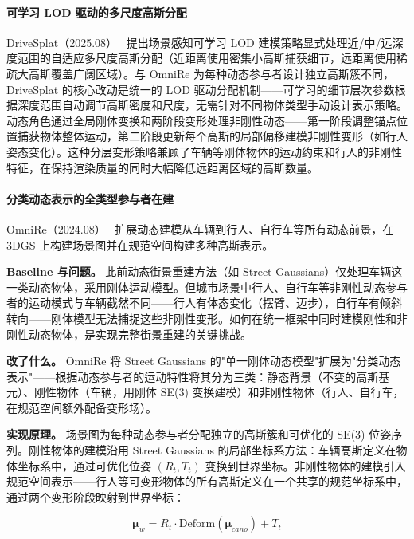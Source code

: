 \paragraph{可学习 LOD 驱动的多尺度高斯分配}

DriveSplat（2025.08）~\cite{2508_15376} 提出场景感知可学习 LOD 建模策略显式处理近/中/远深度范围的自适应多尺度高斯分配（近距离使用密集小高斯捕获细节，远距离使用稀疏大高斯覆盖广阔区域）。与 OmniRe 为每种动态参与者设计独立高斯簇不同，DriveSplat 的核心改动是统一的 LOD 驱动分配机制——可学习的细节层次参数根据深度范围自动调节高斯密度和尺度，无需针对不同物体类型手动设计表示策略。动态角色通过全局刚体变换和两阶段变形处理非刚性动态——第一阶段调整锚点位置捕获物体整体运动，第二阶段更新每个高斯的局部偏移建模非刚性变形（如行人姿态变化）。这种分层变形策略兼顾了车辆等刚体物体的运动约束和行人的非刚性特征，在保持渲染质量的同时大幅降低远距离区域的高斯数量。

\paragraph{分类动态表示的全类型参与者在建}

OmniRe（2024.08）~\cite{2408_16760} 扩展动态建模从车辆到行人、自行车等所有动态前景，在 3DGS 上构建场景图并在规范空间构建多种高斯表示。

\textbf{Baseline 与问题。} 此前动态街景重建方法（如 Street Gaussians）仅处理车辆这一类动态物体，采用刚体运动模型。但城市场景中行人、自行车等非刚性动态参与者的运动模式与车辆截然不同——行人有体态变化（摆臂、迈步），自行车有倾斜转向——刚体模型无法捕捉这些非刚性变形。如何在统一框架中同时建模刚性和非刚性动态物体，是实现完整街景重建的关键挑战。

\textbf{改了什么。} OmniRe 将 Street Gaussians 的"单一刚体动态模型"扩展为"分类动态表示"——根据动态参与者的运动特性将其分为三类：静态背景（不变的高斯基元）、刚性物体（车辆，用刚体 SE(3) 变换建模）和非刚性物体（行人、自行车，在规范空间额外配备变形场）。

\textbf{实现原理。} 场景图为每种动态参与者分配独立的高斯簇和可优化的 SE(3) 位姿序列。刚性物体的建模沿用 Street Gaussians 的局部坐标系方法：车辆高斯定义在物体坐标系中，通过可优化位姿 $(R_t, T_t)$ 变换到世界坐标。非刚性物体的建模引入规范空间表示——行人等可变形物体的所有高斯定义在一个共享的规范坐标系中，通过两个变形阶段映射到世界坐标：

\begin{equation*}
\boldsymbol{\mu}_w = R_t \cdot \text{Deform}(\boldsymbol{\mu}_{cano}) + T_t
\end{equation*}


